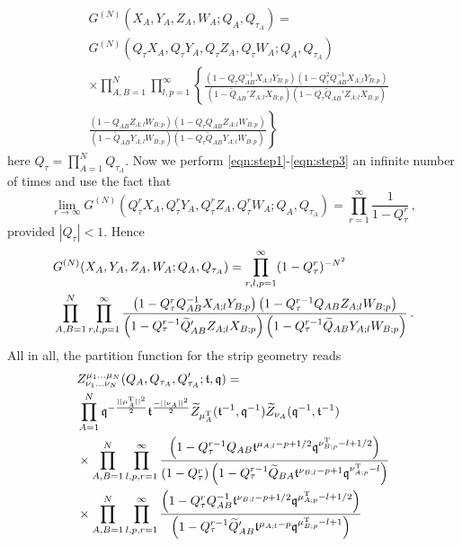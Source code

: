 \documentclass[main.tex]{subfiles}
\begin{document}
\begin{equation}\label{eqn:step3}
\begin{aligned}
&G^{(N)}(X_A,Y_A,Z_A,W_A;Q_A,Q_{\tau_A})=\\
&G^{(N)}\left(Q_{\tau}X_A,Q_{\tau}Y_{A},Q_{\tau}Z_{A},Q_{\tau}W_{A};Q_A,Q_{\tau_A}\right)\\
&\times\prod_{A,B=1}^N\prod_{l,p=1}^{\infty}\left\{\frac{\left(1-Q_{\tau}Q_{AB}^{-1}X_{A;l}Y_{B;p}\right)\left(1-Q_{\tau}^2Q_{AB}^{-1}X_{A;l}Y_{B;p}\right)}{\left(1-\widetilde{Q}_{AB}'Z_{A;l}X_{B;p}\right)\left(1-Q_{\tau}\widetilde{Q}_{AB}'Z_{A;l}X_{B;p}\right)}\right.\\
&\left.\frac{\left(1-Q_{AB}Z_{A;l}W_{B;p}\right)\left(1-Q_{\tau}Q_{AB}Z_{A;l}W_{B;p}\right)}{\left(1-\widetilde{Q}_{AB}Y_{A;l}W_{B;p}\right)\left(1-Q_{\tau}\widetilde{Q}_{AB}Y_{A;l}W_{B;p}\right)}\right\}
\end{aligned}
\end{equation}
here $Q_{\tau}=\prod_{A=1}^{N}Q_{\tau_A}$. Now we perform \eqref{eqn:step1}-\eqref{eqn:step3} an infinite number of times and use the fact that
\begin{equation}
\lim_{r\to\infty}G^{(N)}\left(Q_{\tau}^rX_A,Q_{\tau}^rY_{A},Q_{\tau}^rZ_{A},Q^r_{\tau}W_{A};Q_A,Q_{\tau_A}\right)=\prod_{r=1}^{\infty}\frac{1}{1-Q_{\tau}^r}\,,
\end{equation}
provided $|Q_{\tau}|<1$. Hence
\begin{equation}
\begin{aligned}
&G^{(N)}(X_A,Y_A,Z_A,W_A;Q_A,Q_{\tau_A})=\prod_{r,l,p=1}^{\infty}(1-Q_{\tau}^r)^{-N^2}\\
&\prod_{A,B=1}^N\prod_{r,l,p=1}^{\infty}\frac{\left(1-Q_{\tau}^rQ_{AB}^{-1}X_{A;l}Y_{B;p}\right)\left(1-Q_{\tau}^{r-1}Q_{AB}Z_{A;l}W_{B;p}\right)}{\left(1-Q_{\tau}^{r-1}\widetilde{Q}_{AB}'Z_{A;l}X_{B;p}\right)\left(1-Q_{\tau}^{r-1}\widetilde{Q}_{AB}Y_{A;l}W_{B;p}\right)}\,.
\end{aligned}
\end{equation}
All in all, the partition function for the strip geometry reads
\begin{equation}
\begin{aligned}
&Z^{\mu_1\dots\mu_N}_{\nu_1\dots\nu_N}(Q_{A},Q_{\tau_A},Q_{\tau_A}';\mathfrak{t},\mathfrak{q})=\\
&\prod_{A=1}^N\mathfrak{q}^{-\frac{||\mu_A^{\operatorname{T}}||^2}{2}}\mathfrak{t}^{\frac{-||\nu_A||^2}{2}}\widetilde{Z}_{\mu_A^{\operatorname{T}}}(\mathfrak{t}^{-1},\mathfrak{q}^{-1})\widetilde{Z}_{\nu_A}(\mathfrak{q}^{-1},\mathfrak{t}^{-1})\\
&\times\prod_{A,B=1}^N\prod_{l,p,r=1}^{\infty}\frac{\left(1-Q_{\tau}^{r-1}Q_{AB}\mathfrak{t}^{\mu_{A;l}-p+1/2}\mathfrak{q}^{\nu^{\operatorname{T}}_{B;p}-l+1/2}\right)}{\left(1-Q_{\tau}^r\right)\left(1-Q_{\tau}^{r-1}\widetilde{Q}_{BA}\mathfrak{t}^{\nu_{B;l}-p+1}\mathfrak{q}^{\nu^{\operatorname{T}}_{A;p}-l}\right)}\\
&\times\prod_{A,B=1}^N\prod_{l,p,r=1}^{\infty}\frac{\left(1-Q_{\tau}^{r}Q^{-1}_{AB}\mathfrak{t}^{\nu_{B;l}-p+1/2}\mathfrak{q}^{\mu^{\operatorname{T}}_{A;p}-l+1/2}\right)}{\left(1-Q_{\tau}^{r-1}\widetilde{Q}'_{AB}\mathfrak{t}^{\mu_{A;l}-p}\mathfrak{q}^{\mu^{\operatorname{T}}_{B;p}-l+1}\right)}
\end{aligned}
\end{equation}
\end{document}
